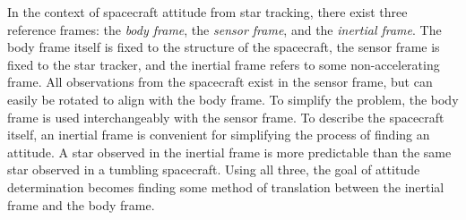 In the context of spacecraft attitude from star tracking, there exist three reference frames: the \textit{body frame},
the \textit{sensor frame}, and the \textit{inertial frame}.
The body frame itself is fixed to the structure of the spacecraft, the sensor frame is fixed to the star tracker,
and the inertial frame refers to some non-accelerating frame.
All observations from the spacecraft exist in the sensor frame, but can easily be rotated to align with the body frame.
To simplify the problem, the body frame is used interchangeably with the sensor frame.
To describe the spacecraft itself, an inertial frame is convenient for simplifying the process of finding an attitude.
A star observed in the inertial frame is more predictable than the same star observed in a tumbling spacecraft.
Using all three, the goal of attitude determination becomes finding some method of translation between the inertial
frame and the body frame.

